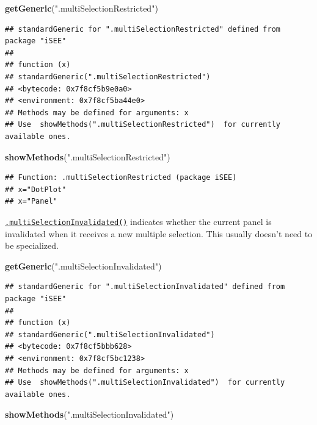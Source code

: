 \documentclass[
]{book}
\newenvironment{Shaded}{\begin{snugshade}}{\end{snugshade}}
\newcommand{\KeywordTok}[1]{\textcolor[rgb]{0.13,0.29,0.53}{\textbf{#1}}}
\newcommand{\NormalTok}[1]{#1}
\newcommand{\StringTok}[1]{\textcolor[rgb]{0.31,0.60,0.02}{#1}}
\begin{document}
\begin{Shaded}
\begin{Highlighting}[]
\KeywordTok{getGeneric}\NormalTok{(}\StringTok{".multiSelectionRestricted"}\NormalTok{)}
\end{Highlighting}
\end{Shaded}

\begin{verbatim}
## standardGeneric for ".multiSelectionRestricted" defined from package "iSEE"
## 
## function (x) 
## standardGeneric(".multiSelectionRestricted")
## <bytecode: 0x7f8cf5b9e0a0>
## <environment: 0x7f8cf5ba44e0>
## Methods may be defined for arguments: x
## Use  showMethods(".multiSelectionRestricted")  for currently available ones.
\end{verbatim}

\begin{Shaded}
\begin{Highlighting}[]
\KeywordTok{showMethods}\NormalTok{(}\StringTok{".multiSelectionRestricted"}\NormalTok{)}
\end{Highlighting}
\end{Shaded}

\begin{verbatim}
## Function: .multiSelectionRestricted (package iSEE)
## x="DotPlot"
## x="Panel"
\end{verbatim}

\href{https://isee.github.io/iSEE/reference/multi-select-generics.html}{\texttt{.multiSelectionInvalidated()}} indicates whether the current panel is invalidated when it receives a new multiple selection.
This usually doesn't need to be specialized.

\begin{Shaded}
\begin{Highlighting}[]
\KeywordTok{getGeneric}\NormalTok{(}\StringTok{".multiSelectionInvalidated"}\NormalTok{)}
\end{Highlighting}
\end{Shaded}

\begin{verbatim}
## standardGeneric for ".multiSelectionInvalidated" defined from package "iSEE"
## 
## function (x) 
## standardGeneric(".multiSelectionInvalidated")
## <bytecode: 0x7f8cf5bbb628>
## <environment: 0x7f8cf5bc1238>
## Methods may be defined for arguments: x
## Use  showMethods(".multiSelectionInvalidated")  for currently available ones.
\end{verbatim}

\begin{Shaded}
\begin{Highlighting}[]
\KeywordTok{showMethods}\NormalTok{(}\StringTok{".multiSelectionInvalidated"}\NormalTok{)}
\end{Highlighting}
\end{Shaded}
\end{document}
